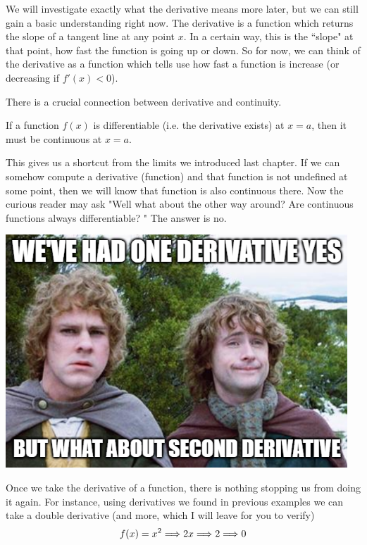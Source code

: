 We will investigate exactly what the derivative means more later, but we can still gain a basic understanding right now. The derivative is a function which returns the slope of a tangent line at any point $x$. In a certain way, this is the ``slope" at that point, how fast the function is going up or down. So for now, we can think of the derivative as a function which tells use how fast a function is increase (or decreasing if $f'(x) < 0$). 

There is a crucial connection between derivative and continuity.
\begin{theorem}
	If a function $f(x)$ is differentiable (i.e. the derivative exists) at $x = a$, then it must be continuous at $x = a$.
\end{theorem}

This gives us a shortcut from the limits we introduced last chapter. If we can somehow compute a derivative (function) and that function is not undefined at some point, then we will know that function is also continuous there. Now the curious reader may ask "Well what about the other way around? Are continuous functions always differentiable? " The answer is no. 

\begin{center}
	\includegraphics[scale=1]{images/Figure 3.1.2.png} 
\end{center}

Once we take the derivative of a function, there is nothing stopping us from doing it again. For instance, using derivatives we found in previous examples we can take a double derivative (and more, which I will leave for you to verify)
\[ f(x) = x^2 \Longrightarrow 2x \Longrightarrow 2 \Longrightarrow 0 \]


